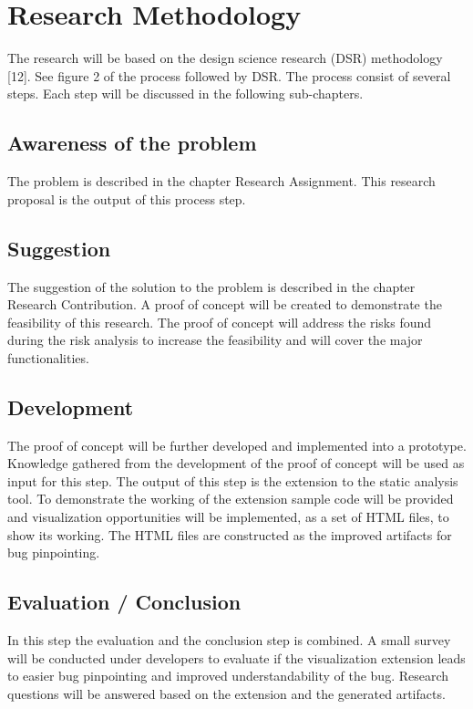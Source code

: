 \section{Research Methodology}
The research will be based on the design science research (DSR) methodology [12]. See figure 2 of the process followed by DSR. 
The process consist of several steps. Each step will be discussed in the following sub-chapters.
\subsection{Awareness of the problem}
The problem is described in the chapter Research Assignment. This research proposal is the output of this process step.
\subsection{Suggestion}
The suggestion of the solution to the problem is described in the chapter Research Contribution. A proof of concept will be created to demonstrate the feasibility of this research. The proof of concept will address the risks found during the risk analysis to increase the feasibility and will cover the major functionalities. 
\subsection{Development}
The proof of concept will be further developed and implemented into a prototype. Knowledge gathered from the development of the proof of concept will be used as input for this step. The output of this step is the extension to the static analysis tool. To demonstrate the working of the extension sample code will be provided and visualization opportunities will be implemented, as a set of HTML files, to show its working. The HTML files are constructed as the improved artifacts for bug pinpointing.
\subsection{Evaluation / Conclusion}
In this step the evaluation and the conclusion step is combined.  A small survey will be conducted under developers to evaluate if the visualization extension leads to easier bug pinpointing and improved understandability of the bug. Research questions will be answered based on the extension and the generated artifacts. 

